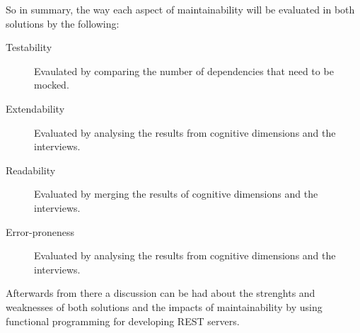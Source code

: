 So in summary, the way each aspect of maintainability will be evaluated in both
solutions by the following:

\begin{description}
    \item [Testability] Evaulated by comparing the number of dependencies that
    need to be mocked. 
    \item [Extendability] Evaluated by analysing the results from cognitive
    dimensions and the interviews.
    \item [Readability] Evaluated by merging the results of cognitive dimensions
    and the interviews.
    \item [Error-proneness] Evaluated by analysing the results from cognitive
    dimensions and the interviews.
\end{description}

Afterwards from there a discussion can be had about the strenghts and weaknesses
of both solutions and the impacts of maintainability by using functional
programming for developing REST servers.



